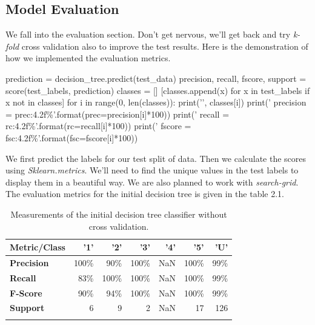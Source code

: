 \documentclass[12pt]{article}
\numberwithin{equation}{section}
\numberwithin{table}{section}
\numberwithin{figure}{section}
\begin{document}
\subsection{Model Evaluation}
We fall into the evaluation section. Don't get nervous, we'll get back and try \textit{k-fold} cross validation also to improve the test results. Here is the demonstration of how we implemented the evaluation metrics.
\begin{python}
	prediction = decision_tree.predict(test_data)
	precision, recall, fscore, support = score(test_labels, prediction)
	classes = []
	[classes.append(x) for x in test_labels if x not in classes]
	for i in range(0, len(classes)):
	print('\nClass ', classes[i])
	print('     precision = {prec:4.2f}\%'.format(prec=precision[i]*100))
	print('     recall = {rc:4.2f}\%'.format(rc=recall[i]*100))
	print('     fscore = {fsc:4.2f}\%'.format(fsc=fscore[i]*100))
\end{python}
We first predict the labels for our test split of data. Then we calculate the scores using \textit{Sklearn.metrics}. We'll need to find the unique values in the test labels to display them in a beautiful way.
We are also planned to work with \textit{search-grid}. The evaluation metrics for the initial decision tree is given in the table 2.1.
\begin{table}[!h] \centering
	\begin{small}
		\begin{tabular}{@{}lrrrrrr@{}}\toprule
			\textbf{Metric/Class} & \textbf{'1'} & \textbf{'2'} & \textbf{'3'} & \textbf{'4'} & \textbf{'5'} & \textbf{'U'}\\ \midrule
			\textbf{Precision} & 100\% & 90\% & 100\% & NaN & 100\% & 99\%\\ \hdashline
			\textbf{Recall} & 83\% & 100\% & 100\% & NaN & 100\% & 99\%\\ \hdashline
			\textbf{F-Score} & 90\% & 94\% & 100\% & NaN & 100\% & 99\%\\ \hdashline
			\textbf{Support} & 6 & 9 & 2 & NaN & 17 & 126\\ \hdashline
			\bottomrule
		\end{tabular}
	\end{small}
	\caption{Measurements of the initial decision tree classifier without cross validation.}
\end{table}
\end{document}
